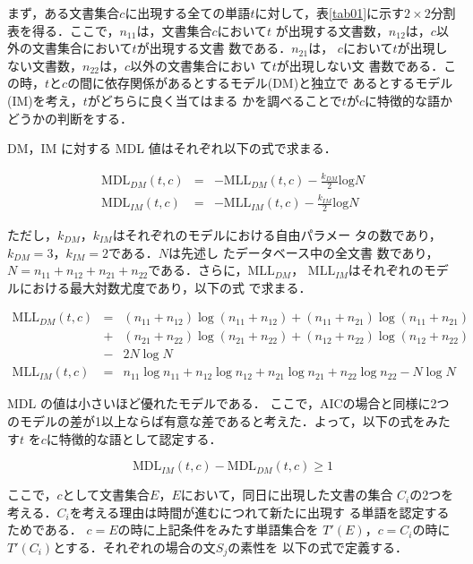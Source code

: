 まず，ある文書集合$c$に出現する全ての単語$t$に対して，表\ref{tab01}に示す$2
\times 2$分割表を得る．ここで，$n_{11}$は，文書集合$c$において$t$
が出現する文書数，$n_{12}$は，$c$以外の文書集合において$t$が出現する文書
数である．$n_{21}$は，
$c$において$t$が出現しない文書数，$n_{22}$は，$c$以外の文書集合におい
て$t$が出現しない文
書数である．この時，$t$と$c$の間に依存関係があるとするモデル(DM)と独立で
あるとするモデル(IM)を考え，$t$がどちらに良く当てはまる
かを調べることで$t$が$c$に特徴的な語かどうかの判断をする．

DM，IM に対する MDL 値はそれぞれ以下の式で求まる．

\begin{eqnarray}
 \mbox{MDL}_{DM}(t,c) &=& - \mbox{MLL}_{DM}(t,c) - \frac{k_{DM}}{2} \mbox{log}N \\
 \mbox{MDL}_{IM}(t,c) &=& - \mbox{MLL}_{IM}(t,c) - \frac{k_{IM}}{2} \mbox{log}N
\end{eqnarray}

\noindent ただし，$k_{DM}$，$k_{IM}$はそれぞれのモデルにおける自由パラメー
タの数であり，$k_{DM}=3$，$k_{IM}=2$である\cite{article50}．$N$は先述し
たデータベース中の全文書
数であり，$N=n_{11}+n_{12}+n_{21}+n_{22}$である．さらに，$\mbox{MLL}_{DM}$，
$\mbox{MLL}_{IM}$はそれぞれのモデルにおける最大対数尤度であり，以下の式
で求まる\cite{article50}．

\begin{eqnarray}
 \mbox{MLL}_{DM}(t,c) &=& (n_{11}+n_{12})\log(n_{11}+n_{12})+(n_{11}+n_{21})\log(n_{11}+n_{21}) \nonumber\\
 &+& (n_{21}+n_{22})\log(n_{21}+n_{22})+(n_{12}+n_{22})\log(n_{12}+n_{22}) \nonumber\\
&-& 2N \log N \nonumber\\
 \mbox{MLL}_{IM}(t,c) &=& n_{11}\log n_{11} +n_{12}\log n_{12}+n_{21}\log n_{21}+n_{22}\log n_{22} -N \log N \nonumber
\end{eqnarray}

MDL の値は小さいほど優れたモデルである．
ここで，AICの場合\cite{article49}と同様に2つのモデルの差が1以上ならば有意な差であると考えた．よって，以下の式をみたす$t$
を$c$に特徴的な語として認定する．

\[
 \mbox{MDL}_{IM}(t,c) - \mbox{MDL}_{DM}(t,c) \ge 1
\]

ここで，$c$として文書集合$E$，$E$において，同日に出現した文書の集合
$C_{i}$の2つを考える．$C_i$を考える理由は時間が進むにつれて新たに出現す
る単語を認定するためである．
$c=E$の時に上記条件をみたす単語集合を
$T'(E)$，$c=C_i$の時に$T'(C_i)$とする．それぞれの場合の文$S_j$の素性を
以下の式で定義する．

